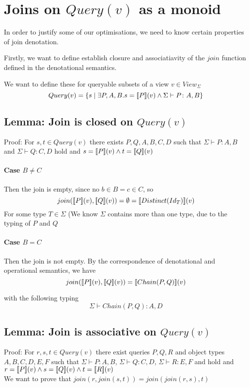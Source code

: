 \documentclass[twoside,a4paper,11pt]{article}
\newcommand{\db}[1]{{\bf [\![}#1{\bf ]\!]}}
\newcommand{\deno}[1]{\db{#1}(v)}
\newcommand{\setComp}[2]{\left\lbrace #1 \mid #2 \right\rbrace}
\newcommand{\typeRule}[2]{\Sigma\vdash #1 \colon #2}
\newcommand{\query}[0]{Query(v)}
\begin{document}
\section{Joins on $\query$ as a monoid}

In order to justify some of our optimisations, we need to know certain properties of join denotation.

Firstly, we want to define establish closure and associatiavity of the $join$ function defined in the denotational semantics.

We want to define these for queryable subsets of a view $v \in View_{\Sigma}$
\begin{equation}
	Query(v) = \setComp{s}{\exists P, A, B. s = \deno{P} \wedge \typeRule{P}{A, B}}
\end{equation}

\subsection{Lemma: Join is closed on $\query$}
Proof:
For $s, t \in Query(v)$ there exists $P, Q, A, B, C, D$ such that $\typeRule{P}{A, B}$ and $\typeRule{Q}{C, D}$ hold and $s = \deno{P} \wedge t = \deno{Q}$

\paragraph{Case $B \neq C$}
	Then the join is empty, since no $b \in B = c \in C$, so 
	\begin{equation}
		join(\deno{P},\deno{Q}) = \emptyset = \deno{Distinct(Id_T)}
	\end{equation}
	For some type $T \in \Sigma$ (We know $\Sigma$ contains more than one type, due to the typing of $P$ and $Q$

 
\paragraph{Case $B = C$}
	Then the join is not empty.
	By the correspondence of denotational and operational semantics, we have
	\begin{equation}
		join(\deno{P}, \deno{Q}) = \deno{Chain(P, Q)}
	\end{equation}
	
	with the following typing
	\begin{equation}
	\typeRule{Chain(P, Q)}{A, D}
	\end{equation}
	 
\subsection{Lemma: Join is associative on $\query$}
Proof: For $r, s, t \in \query$ there exist queries $P, Q, R$ and object types $A, B, C, D, E, F$ such that $\typeRule{P}{A, B}$, $\typeRule{Q}{C, D}$, $\typeRule{R}{E, F}$ and  hold and $r = \deno{P} \wedge s = \deno{Q} \wedge t = \deno{R}$
\\We want to prove that $join(r, join(s, t)) = join(join(r, s), t)$
\end{document}
